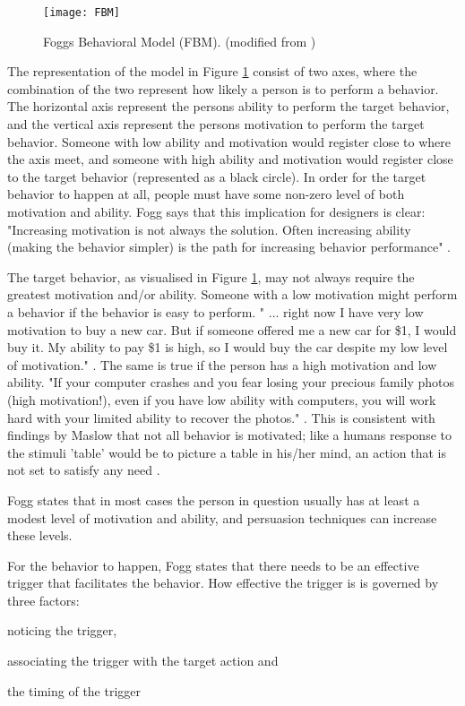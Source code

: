 \begin{figure}[h]
  \centering
    \texttt{[image: FBM]}
  \caption{Foggs Behavioral Model (FBM). (modified from \cite{Fogg2009})}
  \label{fig:FBM}
\end{figure}

The representation of the model in Figure \ref{fig:FBM} consist of two axes, where the combination of the two represent how likely a person is to perform a behavior. The horizontal axis represent the persons ability to perform the target behavior, and the vertical axis represent the persons motivation to perform the target behavior. Someone with low ability and motivation would register close to where the axis meet, and someone with high ability and motivation would register close to the target behavior (represented as a black circle). In order for the target behavior to happen at all, people must have some non-zero level of both motivation and ability. Fogg says that this implication for designers is clear: "Increasing motivation is not always the solution. Often increasing ability (making the behavior simpler) is the path for increasing behavior performance" \cite{Fogg2009}.

The target behavior, as visualised in Figure \ref{fig:FBM}, may not always require the greatest motivation and/or ability. Someone with a low motivation might perform a behavior if the behavior is easy to perform. " ... right now I have very low motivation to buy a new car. But if someone offered me a new car for \$1, I would buy it. My ability to pay \$1 is high, so I would buy the car despite my low level of motivation." \cite{Fogg2009}. The same is true if the person has a high motivation and low ability. "If your computer crashes and you fear losing your precious family photos (high motivation!), even if you have low ability with computers, you will work hard with your limited ability to recover the photos." \cite{Fogg2009}. This is consistent with findings by Maslow that not all behavior is motivated; like a humans response to the stimuli 'table' would be to picture a table in his/her mind, an action that is not set to satisfy any need \cite{Maslow1943}.

Fogg states that in most cases the person in question usually has at least a modest level of motivation and ability, and persuasion techniques can increase these levels.

For the behavior to happen, Fogg states that there needs to be an effective trigger that facilitates the behavior. How effective the trigger is is governed by three factors: \begin{enumerate*}
  \item noticing the trigger,
  \item associating the trigger with the target action and
  \item the timing of the trigger
\end{enumerate*}

